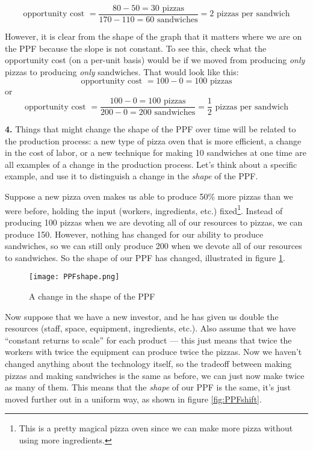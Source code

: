 \documentclass[12pt]{article}
\begin{document}
$$
\text{opportunity cost } = \dfrac{80 - 50 = 30 \text{ pizzas}}{170-110 = 60 \text{ sandwiches}} = 2 \text{ pizzas per sandwich}
$$

However, it is clear from the shape of the graph that it matters where we are on the PPF because the slope is not constant. To see this, check what the opportunity cost (on a per-unit basis) would be if we moved from producing \textit{only} pizzas to producing \textit{only} sandwiches. That would look like this:
$$
\text{opportunity cost } =  100 - 0 = 100 \text{ pizzas}
$$
or
$$
\text{opportunity cost } = \dfrac{100 - 0 = 100 \text{ pizzas}}{200-0 = 200 \text{ sandwiches}} = \frac{1}{2} \text{ pizzas per sandwich}
$$


\medskip

\textbf{4.} Things that might change the shape of the PPF over time will be related to the production process: a new type of pizza oven that is more efficient, a change in the cost of labor, or a new technique for making 10 sandwiches at one time are all examples of a change in the production process. Let's think about a specific example, and use it to distinguish a change in the \textit{shape} of the PPF.

\medskip

Suppose a new pizza oven makes us able to produce 50\% more pizzas than we were before, holding the input (workers, ingredients, etc.) fixed\footnote{This is a pretty magical pizza oven since we can make more pizza without using more ingredients.}. Instead of producing 100 pizzas when we are devoting all of our resources to pizzas, we can produce 150. However, nothing has changed for our ability to produce sandwiches, so we can still only produce 200 when we devote all of our resources to sandwiches. So the shape of our PPF has changed, illustrated in figure \ref{fig:PPFshape}. 

\begin{figure}
    \centering
    \texttt{[image: PPFshape.png]}
    \caption{A change in the shape of the PPF}
    \label{fig:PPFshape}
\end{figure}

\medskip

Now suppose that we have a new investor, and he has given us double the resources (staff, space, equipment, ingredients, etc.). Also assume that we have ``constant returns to scale'' for each product --- this just means that twice the workers with twice the equipment can produce twice the pizzas. Now we haven't changed anything about the technology itself, so the tradeoff between making pizzas and making sandwiches is the same as before, we can just now make twice as many of them. This means that the \textit{shape} of our PPF is the same, it's just moved further out in a uniform way, as shown in figure \ref{fig:PPFshift}.
\end{document}
